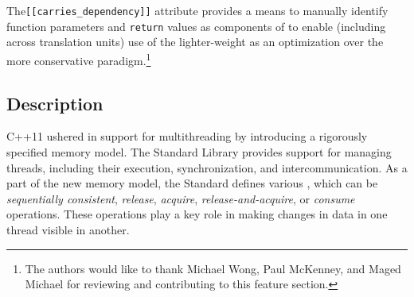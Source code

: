 


\label{the-carries_dependency-attribute}
\setcounter{table}{0}
\setcounter{footnote}{0}
\setcounter{lstlisting}{0}

The\lstinline![[carries_dependency]]! attribute provides a means to
manually identify function parameters and \lstinline!return! values as
components of  to enable (including
across translation units) use of the lighter-weight
  as an
optimization over the more conservative 
paradigm.{\cprotect\footnote{The authors would like to thank Michael
Wong, Paul McKenney, and Maged Michael for reviewing and contributing to this feature section.}}

\subsection[Description]{Description}\label{description}

C++11 ushered in support for multithreading by introducing a rigorously
specified memory model. The Standard Library provides support for
managing threads, including their execution, synchronization, and
intercommunication. As a part of the new memory model, the Standard
defines various , which can be \emph{sequentially
consistent}, \emph{release}, \emph{acquire}, 
\emph{release-and-acquire}, or \emph{consume} operations. These
operations play a key role in making changes in data in one thread
visible in another.

